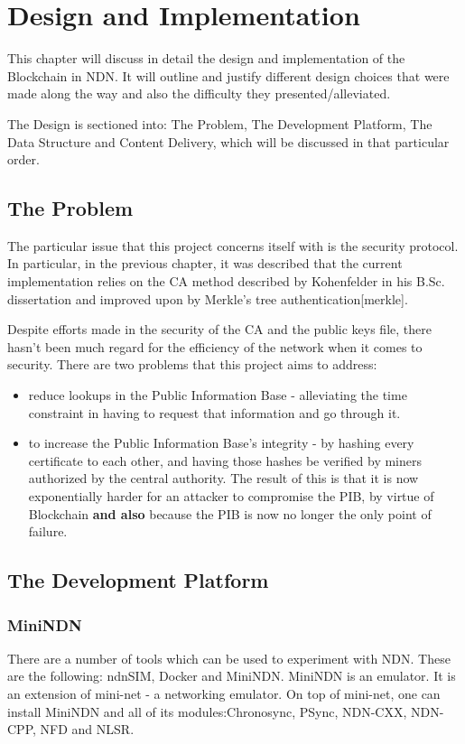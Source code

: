 \chapter{Design and Implementation}
This chapter will discuss in detail the design and implementation of the Blockchain in NDN. It will outline and justify different design choices that were made along the way and also the difficulty they presented/alleviated. 

The Design is sectioned into: The Problem, The Development Platform, The Data Structure and Content Delivery, which will be discussed in that particular order.
\section{The Problem}
The particular issue that this project concerns itself with is the security protocol. In particular, in the previous chapter, it was described that the current implementation relies on the CA method described by Kohenfelder in his B.Sc. dissertation and improved upon by Merkle's tree authentication[merkle]. \par
Despite efforts made in the security of the CA and the public keys file, there hasn't been much regard for the efficiency of the network when it comes to security. There are two problems that this project aims to address: \begin{itemize}

\item reduce lookups in the Public Information Base - alleviating the time constraint in having to request that information and go through it.
\item to increase the Public Information Base's integrity - by hashing every certificate to each other, and having those hashes be verified by miners authorized by the central authority. The result of this is that it is now exponentially harder for an attacker to compromise the PIB, by virtue of Blockchain \textbf{and also} because the PIB is now no longer the only point of failure.
\end{itemize}
\section{The Development Platform}
\subsection{MiniNDN}
There are a number of tools which can be used to experiment with NDN. These are the following: ndnSIM, Docker and MiniNDN.
MiniNDN is an emulator. It is an extension of mini-net - a networking emulator. On top of mini-net, one can install MiniNDN and all of its modules:Chronosync, PSync, NDN-CXX, NDN-CPP, NFD and NLSR.

